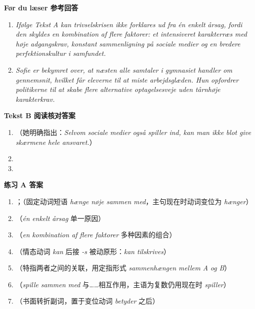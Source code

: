 \begin{answerbox}
\textbf{Før du læser 参考回答}
\begin{enumerate}
  \item \textit{Ifølge Tekst A kan trivselskrisen ikke forklares ud fra én enkelt årsag, fordi den skyldes en kombination af flere faktorer: et intensiveret karakterræs med høje adgangskrav, konstant sammenligning på sociale medier og en bredere perfektionskultur i samfundet.}
  \item \textit{Sofie er bekymret over, at næsten alle samtaler i gymnasiet handler om gennemsnit, hvilket får eleverne til at miste arbejdsglæden. Hun opfordrer politikerne til at skabe flere alternative optagelsesveje uden tårnhøje karakterkrav.}
\end{enumerate}

\textbf{Tekst B 阅读核对答案}
\begin{enumerate}
  \item {}（她明确指出：\textit{Selvom sociale medier også spiller ind, kan man ikke blot give skærmene hele ansvaret.}）
  \item {}
  \item {}
\end{enumerate}

\textbf{练习 A 答案}
\begin{enumerate}
  \item {}；（固定动词短语 \textit{hænge nøje sammen med}，主句现在时动词变位为 \textit{hænger}）
  \item {}（\textit{én enkelt årsag} 单一原因）
  \item {}（\textit{en kombination af flere faktorer} 多种因素的组合）
  \item {}（情态动词 \textit{kan} 后接 \textit{-s} 被动原形：\textit{kan tilskrives}）
  \item {}（特指两者之间的关联，用定指形式 \textit{sammenhængen mellem A og B}）
  \item {}（\textit{spille sammen med} 与……相互作用，主语为复数仍用现在时 \textit{spiller}）
  \item {}（书面转折副词，置于变位动词 \textit{betyder} 之后）
\end{enumerate}


\end{answerbox}
